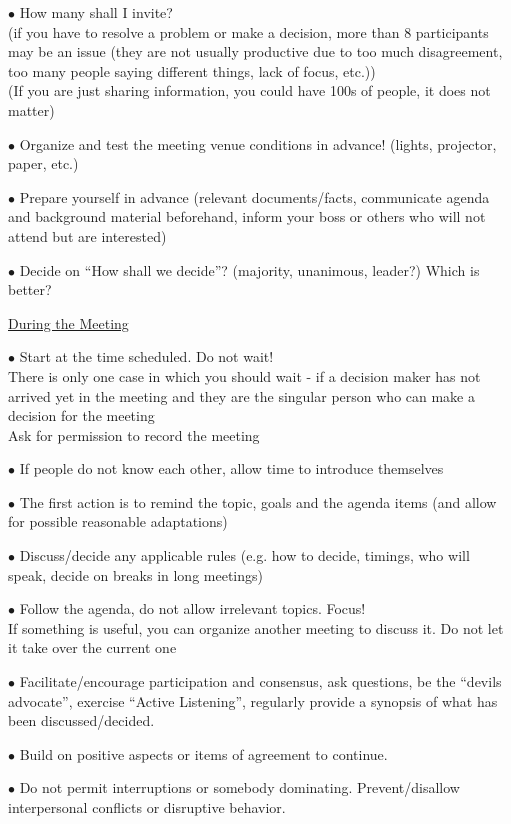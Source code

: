 \documentclass[]{project_plan}
\newcommand{\bulletPoint}{\hspace{-3.1pt}$\bullet$ \hspace{5pt}}
\begin{document}
\bulletPoint  How many shall I invite? \\
(if you have to resolve a problem or make a decision, more than 8 participants may be an issue (they are not usually productive due to too much disagreement, too many people saying different things, lack of focus, etc.))\\
(If you are just sharing information, you could have 100s of people, it does not matter)

\bulletPoint  Organize and test the meeting venue conditions in advance! (lights, projector, paper, etc.)

\bulletPoint  Prepare yourself in advance (relevant documents/facts, communicate agenda and background material beforehand,
inform your boss or others who will not attend but are interested)

\bulletPoint  Decide on “How shall we decide”? (majority, unanimous, leader?) Which is better?

\underline{During the Meeting}

\bulletPoint Start at the time scheduled. Do not wait!\\
There is only one case in which you should wait - if a decision maker has not arrived yet in the meeting and they are the singular person who can make a decision for the meeting\\
Ask for permission to record the meeting

\bulletPoint If people do not know each other, allow time to introduce themselves

\bulletPoint The first action is to remind the topic, goals and the agenda items (and allow for possible reasonable adaptations)

\bulletPoint Discuss/decide any applicable rules (e.g. how to decide, timings, who will speak, decide on breaks in long meetings)

\bulletPoint Follow the agenda, do not allow irrelevant topics. Focus!\\
If something is useful, you can organize another meeting to discuss it. Do not let it take over the current one

\bulletPoint Facilitate/encourage participation and consensus, ask questions, be the “devils advocate”, exercise “Active Listening”, regularly
provide a synopsis of what has been discussed/decided.

\bulletPoint Build on positive aspects or items of agreement to continue.

\bulletPoint Do not permit interruptions or somebody dominating. Prevent/disallow interpersonal conflicts or disruptive behavior.
\end{document}
